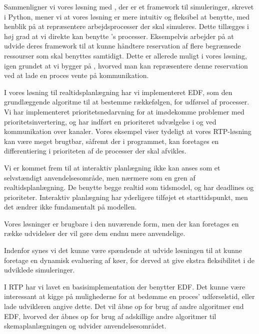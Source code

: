 Sammenligner vi vores løsning med \simpy, der er et framework til simuleringer, skrevet i Python, mener vi at vores løsning er mere intuitiv og fleksibel at benytte, med henblik på at repræsentere arbejdsprocesser der skal simuleres. Dette tillægges i høj grad at vi direkte kan benytte \pycsp's processer. Eksempelvis arbejder \simpy på at udvide deres framework til at kunne håndtere reservation af flere begrænsede ressourser som skal benyttes samtidigt. Dette er allerede muligt i vores løsning, igen grundet at vi bygger på \pycsp, hvorved man kan repræsentere denne reservation ved at lade en proces vente på kommunikation. 

I vores løsning til realtidsplanlægning har vi implementeret EDF, som den grundlæggende algoritme til at bestemme rækkefølgen, for udførsel af processer. Vi har implementeret prioritetsnedarvning for at imødekomme problemer med prioritetsinvertering, og har indført en prioriteret udvælgelse i  og ved kommunikation over kanaler. Vores eksempel viser tydeligt at vores RTP-løsning kan være meget brugtbar, såfremt der i programmet, kan foretages en differentiering i prioriteten af de processer der skal afvikles. 

Vi er kommet frem til at interaktiv planlægning ikke kan anses som et selvstændigt anvendelsesområde, men nærmere som en gren af realtidsplanlægning. De benytte begge realtid som tidsmodel, og har deadlines og prioriteter. Interaktiv planlægning har yderligere tilføjet et starttidspunkt, men det ændrer ikke fundamentalt på modellen. 

Vores løsninger er brugbare i den nuværende form, men der kan foretages en række udvidelser der vil gøre dem endnu mere anvendelige. 

Indenfor \des synes vi det kunne være spændende at udvide løsningen til at kunne foretage en dynamisk evaluering af køer, for derved at give ekstra fleksibilitet i de udviklede simuleringer. 

I RTP har vi lavet en basisimplementation der benytter EDF. Det kunne være interessant at kigge på mulighederne for at bedømme en proces' udførselstid, eller lade udvikleren angive dette. Det vil åbne op for brug af andre algoritmer end EDF, hvorved der åbnes op for brug af adskillige andre algoritmer til skemaplanlægningen og udvider anvendelsesområdet.  







